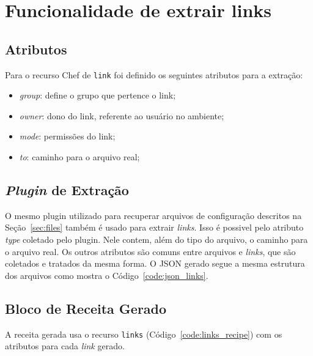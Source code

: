 \section{Funcionalidade de extrair links}
\label{sec:links}

\subsection{Atributos}
Para o recurso Chef de \texttt{link} foi definido os seguintes
atributos para a extração:

\begin{itemize}
  \item \textit{group}: define o grupo que pertence o link;
  \item \textit{owner}: dono do link, referente ao usuário no ambiente;
  \item \textit{mode}: permissões do link;
  \item \textit{to}: caminho para o arquivo real;
\end{itemize}

\subsection{\textit{Plugin} de Extração}

O mesmo plugin utilizado para recuperar arquivos de configuração descritos
na Seção~\ref{sec:files} também é usado para extrair \textit{links}. Isso é possivel
pelo atributo \textit{type} coletado pelo plugin. Nele contem, além do tipo do arquivo,
o caminho para o arquivo real. Os outros atributos são comuns entre arquivos e
\textit{links}, que são coletados e tratados da mesma forma. O JSON gerado segue a
mesma estrutura dos arquivos como mostra o Código~\ref{code:json_links}.

\noindent\begin{minipage}{\textwidth}
  \lstset{style=shell}
  
\end{minipage}\hfill

\subsection{Bloco de Receita Gerado}

A receita gerada usa o recurso \texttt{links} (Código~\ref{code:links_recipe}) com os
atributos para cada \textit{link} gerado.

